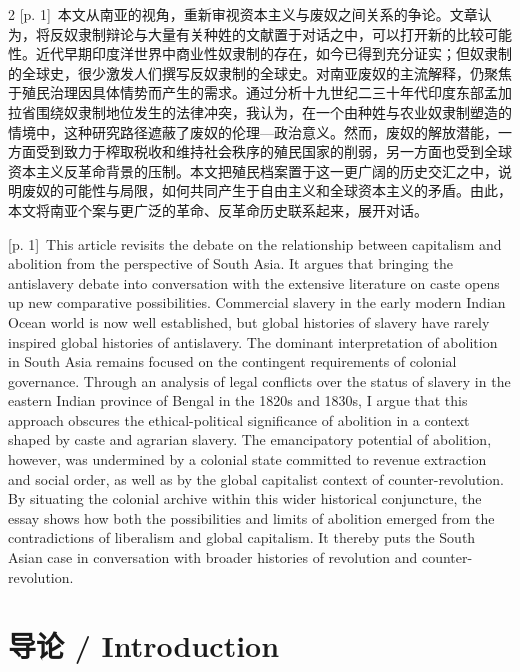 \documentclass[10pt,a4paper]{article}
\begin{document}
\begin{paracol}{2}
{\scriptsize\color{gray} [p. 1]}\ 本文从南亚的视角，重新审视资本主义与废奴之间关系的争论。文章认为，将反奴隶制辩论与大量有关种姓的文献置于对话之中，可以打开新的比较可能性。近代早期印度洋世界中商业性奴隶制的存在，如今已得到充分证实；但奴隶制的全球史，很少激发人们撰写反奴隶制的全球史。对南亚废奴的主流解释，仍聚焦于殖民治理因具体情势而产生的需求。通过分析十九世纪二三十年代印度东部孟加拉省围绕奴隶制地位发生的法律冲突，我认为，在一个由种姓与农业奴隶制塑造的情境中，这种研究路径遮蔽了废奴的伦理—政治意义。然而，废奴的解放潜能，一方面受到致力于榨取税收和维持社会秩序的殖民国家的削弱，另一方面也受到全球资本主义反革命背景的压制。本文把殖民档案置于这一更广阔的历史交汇之中，说明废奴的可能性与局限，如何共同产生于自由主义和全球资本主义的矛盾。由此，本文将南亚个案与更广泛的革命、反革命历史联系起来，展开对话。\par
\switchcolumn
{\scriptsize\color{gray} [p. 1]}\ This article revisits the debate on the relationship between capitalism and abolition from the perspective of South Asia. It argues that bringing the antislavery debate into conversation with the extensive literature on caste opens up new comparative possibilities. Commercial slavery in the early modern Indian Ocean world is now well established, but global histories of slavery have rarely inspired global histories of antislavery. The dominant interpretation of abolition in South Asia remains focused on the contingent requirements of colonial governance. Through an analysis of legal conflicts over the status of slavery in the eastern Indian province of Bengal in the 1820s and 1830s, I argue that this approach obscures the ethical-political significance of abolition in a context shaped by caste and agrarian slavery. The emancipatory potential of abolition, however, was undermined by a colonial state committed to revenue extraction and social order, as well as by the global capitalist context of counter-revolution. By situating the colonial archive within this wider historical conjuncture, the essay shows how both the possibilities and limits of abolition emerged from the contradictions of liberalism and global capitalism. It thereby puts the South Asian case in conversation with broader histories of revolution and counter-revolution.\par
\switchcolumn*
\end{paracol}
\section*{导论 / Introduction}
\end{document}
